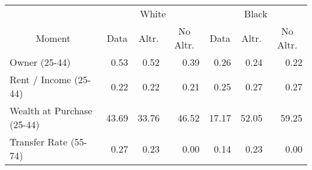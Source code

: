 \begin{tabular}{l rrr rrr}
\toprule & \multicolumn{3}{c}{White} & \multicolumn{3}{c}{Black} \\ \cmidrule(lr){2-4}\cmidrule(lr){5-7}
\multicolumn{1}{c}{Moment} & \multicolumn{1}{c}{Data} & \multicolumn{1}{c}{Altr.} & \multicolumn{1}{c}{No Altr.} & \multicolumn{1}{c}{Data} & \multicolumn{1}{c}{Altr.} & \multicolumn{1}{c}{No Altr.}\\
\midrule
\;Owner (25-44) & 0.53 & 0.52 & 0.39 & 0.26 & 0.24 & 0.22\\
\;Rent / Income (25-44) & 0.22 & 0.22 & 0.21 & 0.25 & 0.27 & 0.27\\
\;Wealth at Purchase (25-44) & 43.69 & 33.76 & 46.52 & 17.17 & 52.05 & 59.25\\
\;Transfer Rate (55-74) & 0.27 & 0.23 & 0.00 & 0.14 & 0.23 & 0.00\\
\bottomrule
\end{tabular}
